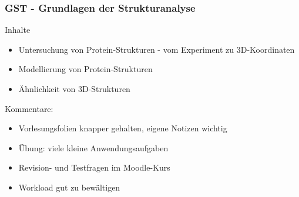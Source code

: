 \begin{frame}
     \frametitle{GST - Grundlagen der Strukturanalyse}
  \logos 


    \begin{alertblock}{Inhalte}
  \small
      \begin{itemize}
          \item Untersuchung von Protein-Strukturen - vom Experiment zu 3D-Koordinaten
          \item Modellierung von Protein-Strukturen
          \item Ähnlichkeit von 3D-Strukturen
      \end{itemize}
  \end{alertblock}
\pause
Kommentare:
\begin{itemize}
    \item Vorlesungsfolien knapper gehalten, eigene Notizen wichtig
    \item Übung: viele kleine Anwendungsaufgaben
    \item Revision- und Testfragen im Moodle-Kurs
    \item Workload gut zu bewältigen
\end{itemize}


  
\end{frame}






